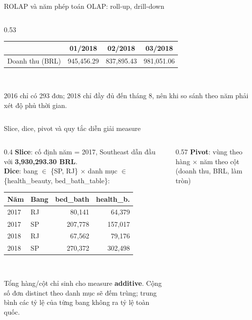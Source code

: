\documentclass[aspectratio=169,10pt,xcolor=table]{beamer}
\begin{document}
\begin{frame}{ROLAP và năm phép toán OLAP: roll-up, drill-down}
\begin{columns}[T]
\begin{column}{0.53\textwidth}
      \begin{tabular}{@{}lccc@{}}
        \toprule
        & 01/2018 & 02/2018 & 03/2018\\
        \midrule
        Doanh thu (BRL) & 945,456.29 & 837,895.43 & 981,051.06\\
        \bottomrule
      \end{tabular}\\[0.1cm]
      {\scriptsize\color{muted}2016 chỉ có 293 đơn; 2018 chỉ đầy đủ đến tháng 8, nên khi so sánh theo năm phải xét độ phủ thời gian.\par}
    \end{column}
  \end{columns}
\end{frame}

\begin{frame}{Slice, dice, pivot và quy tắc diễn giải measure}
  \begin{columns}[T]
    \begin{column}{0.4\textwidth}
      \footnotesize
      \textbf{Slice}: cố định năm = 2017, Southeast dẫn đầu với \textbf{3,930,293.30 BRL}.\\[0.2cm]
      \textbf{Dice}: bang $\in$ \{SP, RJ\} $\times$ danh mục $\in$ \{health\_beauty, bed\_bath\_table\}:\\[0.05cm]
      \begin{tabular}{@{}llrr@{}}
        \toprule
        Năm & Bang & bed\_bath & health\_b.\\
        \midrule
        2017 & RJ & 80,141 & 64,379\\
        2017 & SP & 207,778 & 157,017\\
        2018 & RJ & 67,562 & 79,176\\
        2018 & SP & 270,372 & 302,498\\
        \bottomrule
      \end{tabular}\\[0.2cm]
      \begin{warnbox}
        Tổng hàng/cột chỉ sinh cho measure \textbf{additive}. Cộng số đơn distinct theo danh mục sẽ đếm trùng; trung bình các tỷ lệ của từng bang không ra tỷ lệ toàn quốc.
      \end{warnbox}
    \end{column}
    \begin{column}{0.57\textwidth}
      \footnotesize
      \textbf{Pivot}: vùng theo hàng $\times$ năm theo cột (doanh thu, BRL, làm tròn)\\[0.1cm]
      \begin{tabular}{@{}lrrrr@{}}

\end{tabular}
\end{column}
\end{columns}
\end{frame}
\end{document}
